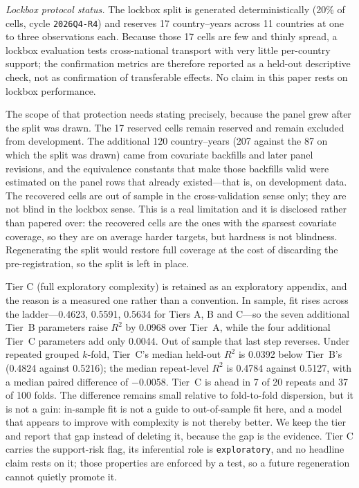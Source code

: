 \documentclass[11pt]{article}
\begin{document}
\emph{Lockbox protocol status.} The lockbox split is generated deterministically (20\% of cells, cycle \texttt{2026Q4-R4}) and reserves 17 country--years across 11 countries at one to three observations each. Because those 17 cells are few and thinly spread, a lockbox evaluation tests cross-national transport with very little per-country support; the confirmation metrics are therefore reported as a held-out descriptive check, not as confirmation of transferable effects. No claim in this paper rests on lockbox performance.

The scope of that protection needs stating precisely, because the panel grew after the split was drawn. The 17 reserved cells remain reserved and remain excluded from development. The additional 120 country--years (\num{207} against the 87 on which the split was drawn) came from covariate backfills and later panel revisions, and the equivalence constants that make those backfills valid were estimated on the panel rows that already existed---that is, on development data. The recovered cells are out of sample in the cross-validation sense only; they are not blind in the lockbox sense. This is a real limitation and it is disclosed rather than papered over: the recovered cells are the ones with the sparsest covariate coverage, so they are on average harder targets, but hardness is not blindness. Regenerating the split would restore full coverage at the cost of discarding the pre-registration, so the split is left in place.

Tier C (full exploratory complexity) is retained as an exploratory appendix, and the reason is a measured one rather than a convention. In sample, fit rises across the ladder---\num{0.4623}, \num{0.5591}, \num{0.5634} for Tiers A, B and C---so the seven additional Tier~B parameters raise $R^2$ by \num{0.0968} over Tier~A, while the four additional Tier~C parameters add only \num{0.0044}. Out of sample that last step reverses. Under repeated grouped $k$-fold, Tier~C's median held-out $R^2$ is \num{0.0392} below Tier~B's (\num{0.4824} against \num{0.5216}); the median repeat-level $R^2$ is \num{0.4784} against \num{0.5127}, with a median paired difference of \num{-0.0058}. Tier~C is ahead in 7 of 20 repeats and 37 of 100 folds. The difference remains small relative to fold-to-fold dispersion, but it is not a gain: in-sample fit is not a guide to out-of-sample fit here, and a model that appears to improve with complexity is not thereby better. We keep the tier and report that gap instead of deleting it, because the gap is the evidence. Tier C carries the support-risk flag, its inferential role is \texttt{exploratory}, and no headline claim rests on it; those properties are enforced by a test, so a future regeneration cannot quietly promote it.
\end{document}
